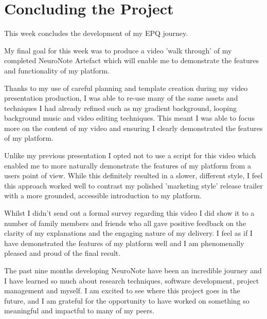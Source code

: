 \section{Concluding the Project}

This week concludes the development of my EPQ journey.

My final goal for this week was to produce a video 'walk through' of my completed NeuroNote Artefact which will enable me to demonstrate the features and functionality of my platform.

Thanks to my use of careful planning and template creation during my video presentation production, I was able to re-use many of the same assets and techniques I had already refined such as my gradient background, looping background music and video editing techniques. This meant I was able to focus more on the content of my video and ensuring I clearly demonstrated the features of my platform. 

Unlike my previous presentation I opted not to use a script for this video which enabled me to more naturally demonstrate the features of my platform from a users point of view. While this definitely resulted in a slower, different style, I feel this approach worked well to contrast my polished 'marketing style' release trailer with a more grounded, accessible introduction to my platform.

Whilst I didn't send out a formal survey regarding this video I did show it to a number of family members and friends who all gave positive feedback on the clarity of my explanations and the engaging nature of my delivery. I feel as if I have demonstrated the features of my platform well and I am phenomenally pleased and proud of the final result. 

The past nine months developing NeuroNote have been an incredible journey and I have learned so much about research techniques, software development, project management and myself. I am excited to see where this project goes in the future, and I am grateful for the opportunity to have worked on something so meaningful and impactful to many of my peers.